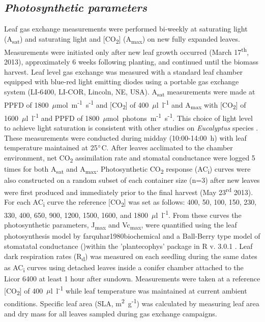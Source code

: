 \documentclass[a4paper]{article}\usepackage[]{graphicx}\usepackage[]{color}
\begin{document}
\subsection*{\textit{Photosynthetic parameters}}
Leaf gas exchange measurements were performed bi-weekly at saturating light (A\textsubscript{sat}) and saturating light and [CO\textsubscript{2}] (A\textsubscript{max}) on new fully expanded leaves. Measurements were initiated only after new leaf growth occurred (March 17\textsuperscript{th}, 2013), approximately 6 weeks following planting, and continued until the biomass harvest. Leaf level gas exchange was measured with a standard leaf chamber equipped with blue-red light emitting diodes using a portable gas exchange system (LI-6400, LI-COR, Lincoln, NE, USA). A\textsubscript{sat} measurements were made at PPFD of 1800~$\mu$mol~m\textsuperscript{-1}~s\textsuperscript{-1} and [CO\textsubscript{2}] of 400~$\mu$l~l\textsuperscript{-1} and A\textsubscript{max} with [CO\textsubscript{2}] of 1600~$\mu$l~l\textsuperscript{-1} and PPFD of 1800~$\mu$mol~photons~m\textsuperscript{-1}~s\textsuperscript{-1}. This choice of light level to achieve light saturation is consistent with other studies on \textit{Eucalyptus} species \cite{kallarackal1997ecophysiological,pinkard1998photosynthetic,crous2013photosynthesis,drake2014capacity}. These measurements were conducted during midday (10:00-14:00~h) with leaf temperature maintained at 25$\degree$C. After leaves acclimated to the chamber environment, net CO\textsubscript{2} assimilation rate and stomatal conductance were logged 5 times for both A\textsubscript{sat} and A\textsubscript{max}. Photosynthetic CO\textsubscript{2} response (AC\textsubscript{i}) curves were also constructed on a random subset of each container size (n=3) after new leaves were first produced and immediately prior to the final harvest (May 23\textsuperscript{rd} 2013). For each AC\textsubscript{i} curve the reference [CO\textsubscript{2}] was set as follows:  400, 50, 100, 150, 230, 330, 400, 650, 900, 1200, 1500, 1600, and 1800~$\mu$l~l\textsuperscript{-1}. From these curves the photosynthetic parameters, J\textsubscript{max} and Vc\textsubscript{max}, were quantified using the leaf photosynthesis model by farquhar1980biochemical and a Ball-Berry type model of stomatatal conductance ()within the 'plantecophys' package in R v. 3.0.1 \cite{plantecophys,RDevelopmentCoreTeam2011}.  Leaf dark respiration rates (R\textsubscript{d}) was measured on each seedling during the same dates as AC\textsubscript{i} curves using detached leaves inside a conifer chamber attached to the Licor 6400 at least 1 hour after sundown.   Measurements were taken at a reference [CO\textsubscript{2}] of 400~$\mu$l~l\textsuperscript{-1} while leaf temperature was maintained at current ambient conditions. Specific leaf area (SLA, m\textsuperscript{2}~g\textsuperscript{-1}) was calculated by measuring leaf area and dry mass for all leaves sampled during gas exchange campaigns.
\end{document}
